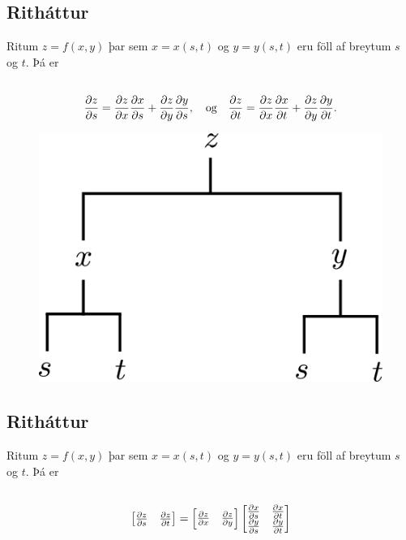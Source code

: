 \documentclass[a4paper,10pt,icelandic]{sphinxmanual}
\begin{document}
\subsection{Ritháttur}
\label{Kafli2:id18}
Ritum \(z=f(x,y)\) þar sem \(x=x(s,t)\) og \(y=y(s,t)\) eru
föll af breytum \(s\) og \(t\). Þá er
\begin{gather}
\begin{split}\displaystyle\end{split}\notag\\\begin{split}\frac{\partial z}{\partial s}=
\frac{\partial z}{\partial x}\frac{\partial x}{\partial s}
+\frac{\partial z}{\partial y}\frac{\partial y}{\partial s}, \quad \text{og}\quad \frac{\partial z}{\partial t}=
\frac{\partial z}{\partial x}\frac{\partial x}{\partial t}
+\frac{\partial z}{\partial y}\frac{\partial y}{\partial t}.\end{split}\notag
\end{gather}\begin{figure}[htbp]
\centering

\includegraphics[width=0.300\linewidth]{chain2.png}
\end{figure}


\subsection{Ritháttur}
\label{Kafli2:id19}
Ritum \(z=f(x,y)\) þar sem \(x=x(s,t)\) og \(y=y(s,t)\) eru
föll af breytum \(s\) og \(t\). Þá er
\begin{gather}
\begin{split}\displaystyle\end{split}\notag\\\begin{split}\begin{bmatrix}\frac{\partial z}{\partial s}
& \frac{\partial z}{\partial t}\end{bmatrix}
=\begin{bmatrix}\frac{\partial z}{\partial x}
& \frac{\partial z}{\partial y}\end{bmatrix}
\begin{bmatrix}\frac{\partial x}{\partial s}
& \frac{\partial x}{\partial t}\\
\frac{\partial y}{\partial s}
& \frac{\partial y}{\partial t}
\end{bmatrix}\end{split}\notag
\end{gather}
\end{document}
